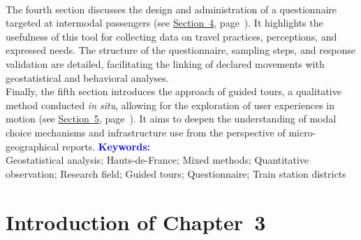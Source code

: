 \begin{refsegment}
\begin{tcolorbox}
{    \\
The fourth section discusses the design and administration of a questionnaire targeted at intermodal passengers (see \hyperref[chap3:questionnaire]{Section~4}, page~\pageref{chap3:questionnaire}). It highlights the usefulness of this tool for collecting data on travel practices, perceptions, and expressed needs. The structure of the questionnaire, sampling steps, and response validation are detailed, facilitating the linking of declared movements with geostatistical and behavioral analyses.%
    \\
Finally, the fifth section introduces the approach of guided tours, a qualitative method conducted \textsl{in situ}, allowing for the exploration of user experiences in motion (see \hyperref[chap3:parcours-commente]{Section~5}, page~\pageref{chap3:parcours-commente}). It aims to deepen the understanding of modal choice mechanisms and infrastructure use from the perspective of micro-geographical reports.%
    }
    \tcblower
\Large{\textcolor{blue}{\textbf{Keywords:}}}
    \\
    \small{
Geostatistical analysis;
Hauts-de-France;
Mixed methods;
Quantitative observation;
Research field;
Guided tours;
Questionnaire;
Train station districts
    }
    \end{tcolorbox}

    \newpage
\section*{Introduction of Chapter~3
    \label{chap3:introduction}
    }


\end{refsegment}
